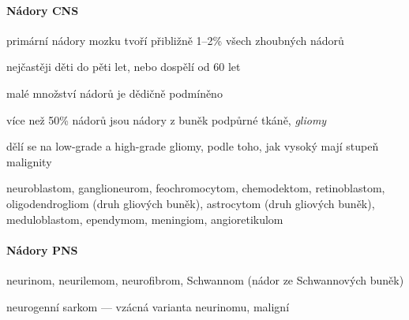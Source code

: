 \documentclass[DIV=8]{scrreprt}
\begin{document}
\paragraph{Nádory CNS}
\begin{myItemize}[nosep]
    \item primární nádory mozku tvoří přibližně 1--2\% všech zhoubných nádorů
    \item nejčastěji děti do pěti let, nebo dospělí od 60 let
    \item malé množství nádorů je dědičně podmíněno
    \item více než 50\% nádorů jsou nádory z buněk podpůrné tkáně, \emph{gliomy}
\begin{myItemize}[nosep]
    \item dělí se na low-grade a high-grade gliomy, podle toho, jak vysoký mají stupeň malignity
\end{myItemize}

    \item neuroblastom, ganglioneurom, feochromocytom, chemodektom, retinoblastom, oligodendrogliom (druh gliových buněk), astrocytom (druh gliových buněk), meduloblastom, ependymom, meningiom, angioretikulom
\end{myItemize}



\paragraph{Nádory PNS}
\begin{myItemize}[nosep]
    \item neurinom, neurilemom, neu­rofi­brom, Schwannom (nádor ze Schwannových buněk)
    \item neurogenní sarkom --- vzácná varianta neurinomu, maligní
\end{myItemize}
\end{document}
